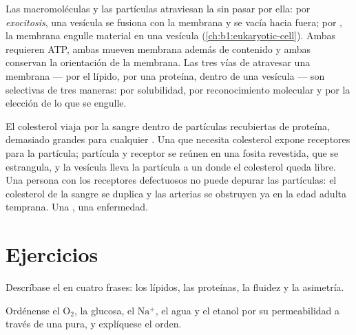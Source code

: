 \begin{proposition}\label{prop:b1:membranes-transport:vesicles}
Las macromoléculas y las partículas atraviesan la  sin
pasar por ella: por \emph{exocitosis}, una vesícula se fusiona con la
membrana y se vacía hacia fuera; por \emph{}, la membrana engulle
material en una vesícula (\cref{ch:b1:eukaryotic-cell}). Ambas requieren
ATP, ambas mueven membrana además de contenido y ambas conservan la
orientación de la membrana. Las tres vías de atravesar una membrana --- por
el lípido, por una proteína, dentro de una vesícula --- son selectivas de
tres maneras: por solubilidad, por reconocimiento molecular y por la
elección de lo que se engulle.
\end{proposition}

\begin{example}\label{ex:b1:membranes-transport:ldl}
El colesterol viaja por la sangre dentro de partículas recubiertas de
proteína, demasiado grandes para cualquier . Una  que
necesita colesterol expone receptores para la partícula; partícula y
receptor se reúnen en una fosita revestida, que se estrangula, y la vesícula
lleva la partícula a un  donde el colesterol queda libre. Una
persona con los receptores defectuosos no puede depurar las partículas: el
colesterol de la sangre se duplica y las arterias se obstruyen ya en la edad
adulta temprana. Una , una enfermedad.
\end{example}

\section{Ejercicios}

\begin{exercise}[$\star$]\label{exo:b1:membranes-transport:1}
Descríbase el  en cuatro frases: los lípidos, las
proteínas, la fluidez y la asimetría.
\end{exercise}

\begin{exercise}[$\star$]\label{exo:b1:membranes-transport:2}
Ordénense el $\mathrm{O_2}$, la glucosa, el $\mathrm{Na^+}$, el agua y el
etanol por su permeabilidad a través de una  pura, y
explíquese el orden.
\end{exercise}

